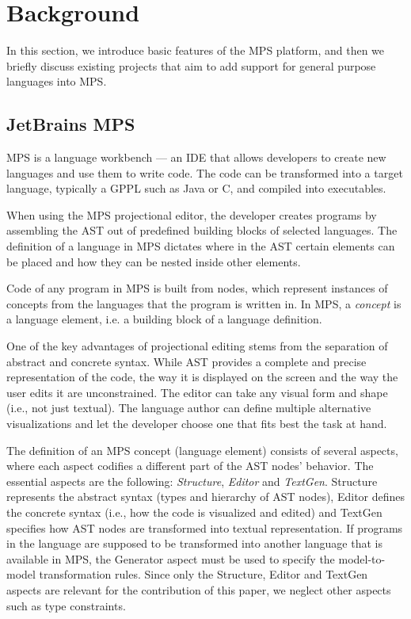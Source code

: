 \section{Background}
\label{sect:BACKGROUND}

In this section, we introduce basic features of the MPS platform, and then we briefly discuss existing projects that aim to add support for general purpose languages into MPS.

\subsection{JetBrains MPS}
\label{sect:MPS}

MPS is a language workbench --- an IDE that allows developers to create new languages and use them to write code.
The code can be transformed into a target language, typically a GPPL such as Java or C, and compiled into executables.

When using the MPS projectional editor, the developer creates programs by assembling the AST out of predefined building blocks of selected languages.
The definition of a language in MPS dictates where in the AST certain elements can be placed and how they can be nested inside other elements.

Code of any program in MPS is built from nodes, which represent instances of concepts from the languages that the program is written in.
In MPS, a \emph{concept} is a language element, i.e. a building block of a language definition.

One of the key advantages of projectional editing stems from the separation of abstract and concrete syntax.
While AST provides a complete and precise representation of the code, the way it is displayed on the screen and the way the user edits it are unconstrained.
The editor can take any visual form and shape (i.e., not just textual).
The language author can define multiple alternative visualizations and let the developer choose one that fits best the task at hand.

The definition of an MPS concept (language element) consists of several aspects, where each aspect codifies a different part of the AST nodes' behavior.
The essential aspects are the following: \emph{Structure}, \emph{Editor} and \emph{TextGen}.
Structure represents the abstract syntax (types and hierarchy of AST nodes), Editor defines the concrete syntax (i.e., how the code is visualized and edited) and TextGen specifies how AST nodes are transformed into textual representation.
If programs in the language are supposed to be transformed into another language that is available in MPS, the Generator aspect must be used to specify the model-to-model transformation rules.
Since only the Structure, Editor and TextGen aspects are relevant for the contribution of this paper, we neglect other aspects such as type constraints.

